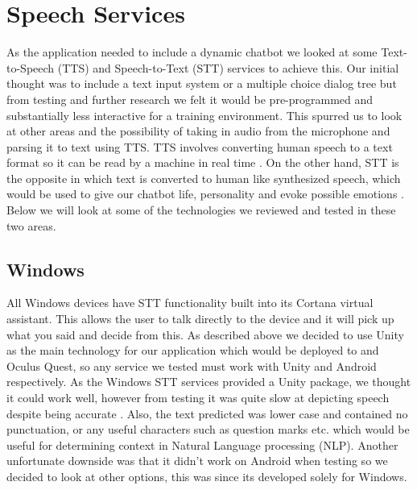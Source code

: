 \section{Speech Services}
As the application needed to include a dynamic chatbot we looked at some Text-to-Speech (TTS) and Speech-to-Text (STT) services to achieve this. Our initial thought was to include a text input system or a multiple choice dialog tree but from testing and further research we felt it would be pre-programmed and substantially less interactive for a training environment. This spurred us to look at other areas and the possibility of taking in audio from the microphone and parsing it to text using TTS. TTS involves converting human speech to a text format so it can be read by a machine in real time \cite{EJ122858920190101}. On the other hand, STT is the opposite in which text is converted to human like synthesized speech, which would be used to give our chatbot life, personality and evoke possible emotions \cite{ED60067020190801}. Below we will look at some of the technologies we reviewed and tested in these two areas.

\subsection{Windows}
All Windows devices have STT functionality built into its Cortana virtual assistant. This allows the user to talk directly to the device and it will pick up what you said and decide from this. As described above we decided to use Unity as the main technology for our application which would be deployed to and Oculus Quest, so any service we tested must work with Unity and Android respectively. As the Windows STT services provided a Unity package, we thought it could work well, however from testing it was quite slow at depicting speech despite being accurate \cite{unityspeech}. Also, the text predicted was lower case and contained no punctuation, or any useful characters such as question marks etc. which would be useful for determining context in Natural Language processing (NLP). Another unfortunate downside was that it didn't work on Android when testing so we decided to look at other options, this was since its developed solely for Windows. 

